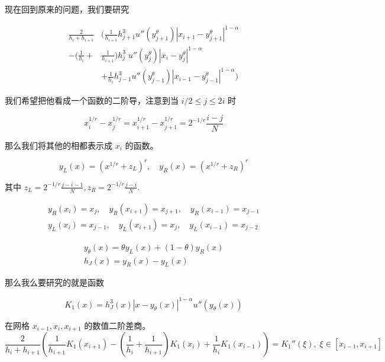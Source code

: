 \documentclass{ctexart}
\begin{document}
现在回到原来的问题，我们要研究

\begin{equation}
    \begin{aligned}
        \frac{2}{h_i + h_{i+1}} 
        & ( \frac{1}{h_{i+1}}  h_{j+1}^{3} u''(y_{j+1}^\theta) |x_{i+1} - y_{j+1}^\theta|^{1-\alpha} \\
        - (\frac{1}{h_{i}} +& \frac{1}{h_{i+1}}) h_j^{3} \; u''(y_j^\theta) |x_i - y_j^\theta|^{1-\alpha}    \\
        &+  \frac{1}{h_{i}} h_{j-1}^{3} u''(y_{j-1}^\theta) |x_{i-1} - y_{j-1}^\theta|^{1-\alpha} )
    \end{aligned}
\end{equation}

我们希望把他看成一个函数的二阶导，注意到当 \(i/2 \le j \le 2i\) 时

\begin{equation}
    x_i^{1/r} - x_j^{1/r} = x_{i+1}^{1/r} - x_{j+1}^{1/r} = 2^{-1/r}\frac{i-j}{N}
\end{equation}

那么我们将其他的相都表示成 \(x_i\) 的函数。

\begin{equation}
        y_L(x) = (x^{1/r} + z_L)^r , \quad y_R(x) =  (x^{1/r} + z_R)^r
\end{equation}

其中 \(z_L = 2^{-1/r}\frac{j-i-1}{N}, z_R = 2^{-1/r}\frac{j-i}{N}\).

\begin{gather}
    y_R(x_i)=x_j, \quad y_R(x_{i+1}) = x_{j+1}, \quad y_R(x_{i-1}) = x_{j-1} \\
    y_L(x_i) = x_{j-1} ,\quad y_L(x_{i+1}) = x_{j}, \quad y_L(x_{i-1}) = x_{j-2}
\end{gather}

\begin{gather}
    y_\theta(x) = \theta y_L(x) + (1-\theta) y_R(x)      \\
    h_J(x) = y_R(x) - y_L(x)
\end{gather}

那么我么要研究的就是函数

\begin{equation}
    K_1(x) = h_J^3(x) |x - y_\theta(x)|^{1-\alpha} u''(y_\theta(x))
\end{equation}

在网格 \(x_{i-1}, x_i , x_{i+1}\) 的数值二阶差商。
\begin{equation}
    \frac{2}{h_i + h_{i+1}} 
    ( \frac{1}{h_{i+1}}  K_1(x_{i+1}) - (\frac{1}{h_{i}} + \frac{1}{h_{i+1}}) K_1(x_{i}) + \frac{1}{h_{i}} K_1(x_{i-1})) = K_1''(\xi), \;\xi\in [x_{i-1}, x_{i+1}]
\end{equation}
\end{document}
